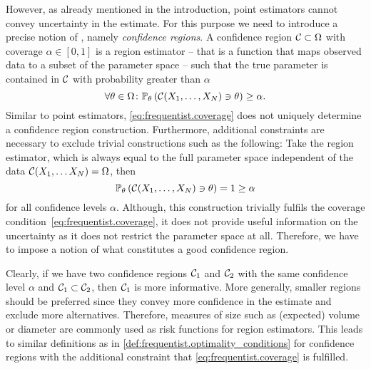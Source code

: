However, as already mentioned in the introduction, point estimators cannot convey uncertainty in the estimate. 
For this purpose we need to introduce a precise notion of , namely \emph{confidence regions}.
A confidence region $\mathcal{C} \subset \Omega$ with coverage $\alpha \in [0,1]$ is a region estimator -- that is a function that maps observed data to a subset of the parameter space -- such that the true parameter is contained in $\mathcal{C}$ with probability greater than $\alpha$
\[
  \label{eq:frequentist.coverage}
  \forall \theta\in\Omega \colon \mathbb{P}_\theta\left( \mathcal{C}(X_1, \ldots, X_N) \ni \theta \right) \ge \alpha.
\]
Similar to point estimators, \cref{eq:frequentist.coverage} does not uniquely determine a confidence region construction.
Furthermore, additional constraints are necessary to exclude trivial constructions such as the following:
Take the region estimator, which is always equal to the full parameter space independent of the data $\mathcal{C}(X_1, \ldots X_N) = \Omega$, then 
\[
  \mathbb{P}_\theta\left(  \mathcal{C}(X_1, \ldots, X_N) \ni \theta  \right) = 1 \ge \alpha
\]
for all confidence levels $\alpha$.
Although, this construction trivially fulfils the coverage condition~\eqref{eq:frequentist.coverage}, it does not provide useful information on the uncertainty as it does not restrict the parameter space at all.
Therefore, we have to impose a notion of what constitutes a good confidence region.

Clearly, if we have two confidence regions $\mathcal{C}_1$ and $\mathcal{C}_2$ with the same confidence level $\alpha$ and $\mathcal{C}_1 \subset \mathcal{C}_2$, then $\mathcal{C}_1$ is more informative.
More generally, smaller regions should be preferred since they convey more confidence in the estimate and exclude more alternatives.
Therefore, measures of size such as (expected) volume or diameter are commonly used as risk functions for region estimators.
This leads to similar definitions as in \cref{def:frequentist.optimality_conditions} for confidence regions with the additional constraint that \cref{eq:frequentist.coverage} is fulfilled.

